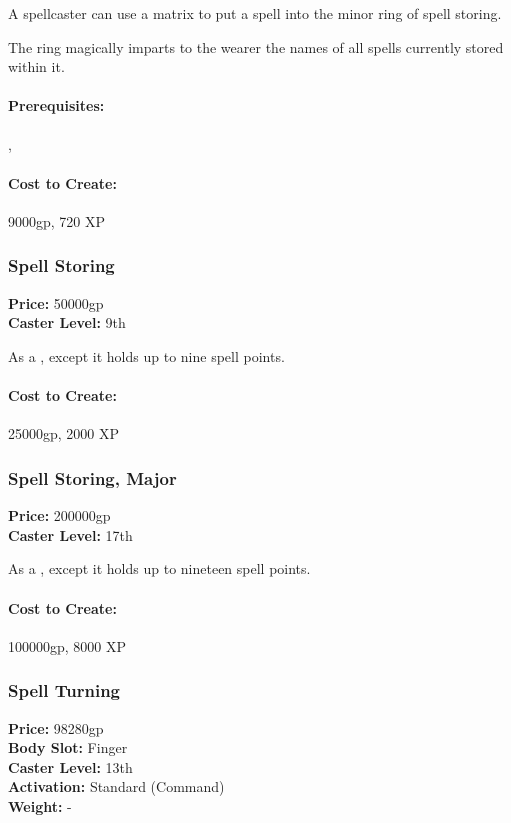 A spellcaster can use a matrix to put a spell into the minor ring of spell storing.

The ring magically imparts to the wearer the names of all spells currently stored within it.

\paragraph{Prerequisites:} , 

\paragraph{Cost to Create:} 9000gp, 720 XP
\subsubsection{Spell Storing}
\label{Item:SpellStoring}
   \textbf{Price:} 50000gp
\\ \textbf{Caster Level:} 9th

As a , except it holds up to nine spell points.

\paragraph{Cost to Create:} 25000gp, 2000 XP
\subsubsection{Spell Storing, Major}
\label{Item:SpellStoringMajor}
   \textbf{Price:} 200000gp
\\ \textbf{Caster Level:} 17th

As a , except it holds up to nineteen spell points.

\paragraph{Cost to Create:} 100000gp, 8000 XP
\subsubsection{Spell Turning}
\label{Item:SpellTurning}
   \textbf{Price:} 98280gp
\\ \textbf{Body Slot:} Finger
\\ \textbf{Caster Level:} 13th
\\ \textbf{Activation:} Standard (Command)
\\ \textbf{Weight:} -

